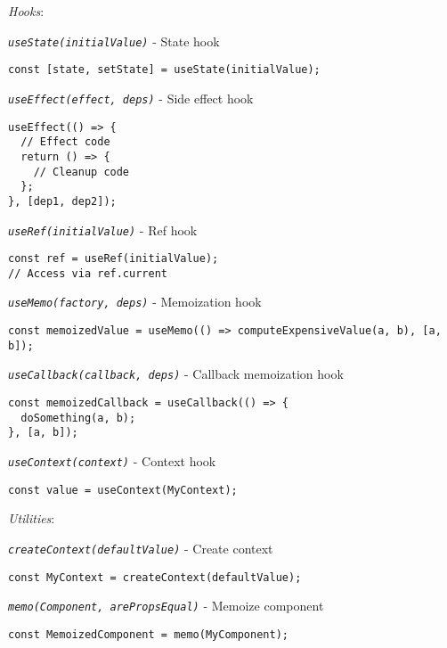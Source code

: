 \documentclass[11pt]{article}
\begin{document}
\emph{Hooks}:

\emph{\texttt{useState(initialValue)}} - State hook

\begin{verbatim}
const [state, setState] = useState(initialValue);
\end{verbatim}

\emph{\texttt{useEffect(effect, deps)}} - Side effect hook

\begin{verbatim}
useEffect(() => {
  // Effect code
  return () => {
    // Cleanup code
  };
}, [dep1, dep2]);
\end{verbatim}

\emph{\texttt{useRef(initialValue)}} - Ref hook

\begin{verbatim}
const ref = useRef(initialValue);
// Access via ref.current
\end{verbatim}

\emph{\texttt{useMemo(factory, deps)}} - Memoization hook

\begin{verbatim}
const memoizedValue = useMemo(() => computeExpensiveValue(a, b), [a, b]);
\end{verbatim}

\emph{\texttt{useCallback(callback, deps)}} - Callback memoization hook

\begin{verbatim}
const memoizedCallback = useCallback(() => {
  doSomething(a, b);
}, [a, b]);
\end{verbatim}

\emph{\texttt{useContext(context)}} - Context hook

\begin{verbatim}
const value = useContext(MyContext);
\end{verbatim}

\emph{Utilities}:

\emph{\texttt{createContext(defaultValue)}} - Create context

\begin{verbatim}
const MyContext = createContext(defaultValue);
\end{verbatim}

\emph{\texttt{memo(Component, arePropsEqual)}} - Memoize component

\begin{verbatim}
const MemoizedComponent = memo(MyComponent);
\end{verbatim}
\end{document}
